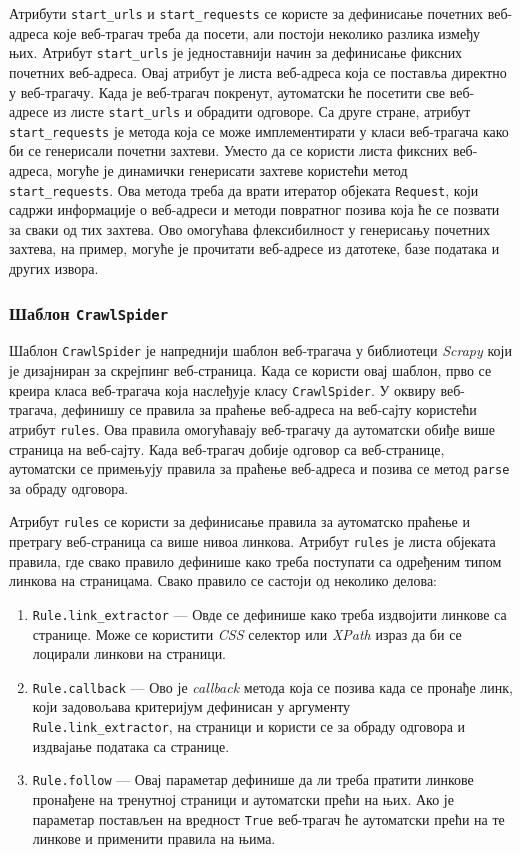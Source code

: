 \documentclass[12pt,oneside]{memoir}
\begin{document}
Атрибути \texttt{start\_urls} и \texttt{start\_requests} се користе за дефинисање почетних веб-адреса које веб-трагач треба да посети, али постоји неколико разлика између њих. Атрибут \texttt{start\_urls} је једноставнији начин за дефинисање фиксних почетних веб-адреса. Овај атрибут је листа веб-адреса која се поставља директно у веб-трагачу. Када је веб-трагач покренут, аутоматски ће посетити све веб-адресе из листе \texttt{start\_urls} и обрадити одговоре. Са друге стране, атрибут \texttt{start\_requests} је метода која се може имплементирати у класи веб-трагача како би се генерисали почетни захтеви. Уместо да се користи листа фиксних веб-адреса, могуће је динамички генерисати захтеве користећи метод \texttt{start\_requests}. Ова метода треба да врати итератор објеката \texttt{Request}, који садржи информације о веб-адреси и методи повратног позива која ће се позвати за сваки од тих захтева.
Ово омогућава флексибилност у генерисању почетних захтева, на пример, могуће је прочитати веб-адресе из датотеке, базе података и других извора.

\subsubsection{Шаблон \texttt{CrawlSpider}}
Шаблон \texttt{CrawlSpider} је напреднији шаблон веб-трагача у библиотеци \textit{Scrapy} који је дизајниран за скрејпинг веб-страница. Када се користи овај шаблон, прво се креира класа веб-трагача која наслеђује класу \texttt{CrawlSpider}. У оквиру веб-трагача, дефинишу се правила за праћење веб-адреса на веб-сајту користећи атрибут \texttt{rules}. Ова правила омогућавају веб-трагачу да аутоматски обиђе више страница на веб-сајту. Када веб-трагач добије одговор са веб-странице, аутоматски се примењују правила за праћење веб-адреса и позива се метод \texttt{parse} за обраду одговора.

Атрибут \texttt{rules} се користи за дефинисање правила за аутоматско праћење и претрагу веб-страница са више нивоа линкова. Атрибут \texttt{rules} је листа објеката правила, где свако правило дефинише како треба поступати са одређеним типом линкова на страницама. Свако правило се састоји од неколико делова:  

\begin{enumerate}
    \item \texttt{Rule.link\_extractor} --- Овде се дефинише како треба издвојити линкове са странице. Може се користити \textit{CSS} селектор или \textit{XPath} израз да би се лоцирали линкови на страници.
    \item \texttt{Rule.callback} --- Ово је \textit{callback} метода која се позива када се пронађе линк, који задовољава критеријум дефинисан у аргументу \\ \texttt{Rule.link\_extractor}, на страници и користи се за обраду одговора и издвајање података са странице.    
    \item \texttt{Rule.follow} --- Овај параметар дефинише да ли треба пратити линкове пронађене на тренутној страници и аутоматски прећи на њих. Ако је параметар постављен на вредност \texttt{True} веб-трагач ће аутоматски прећи на те линкове и применити правила на њима.
\end{enumerate}
\end{document}
